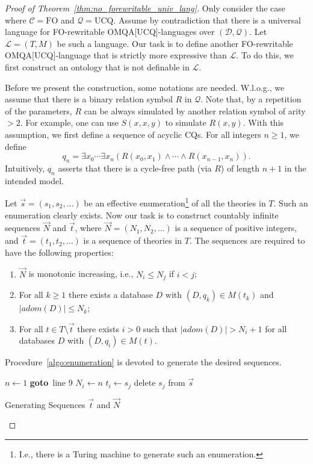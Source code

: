 \documentclass[letterpaper]{article} %
\theoremstyle{definition}
\theoremstyle{remark}
\theoremstyle{definition}
\begin{document}
\begin{proof}[Proof of Theorem~\ref{thm:no_forewritable_univ_lang}]
Only consider the case where $\mathcal{C}=\text{FO}$ and $\mathcal{Q}=\text{UCQ}$. Assume by contradiction that there is a universal language for FO-rewritable OMQA[UCQ]-languages over $(\mathscr{D},\mathscr{Q})$. Let $\mathcal{L}=(T,M)$ be such a language. Our task is to define another FO-rewritable OMQA[UCQ]-language that is strictly more expressive than $\mathcal{L}$. To do this, we first construct an ontology that is not definable in $\mathcal{L}$.

Before we present the construction, some notations are needed. W.l.o.g., we assume that there is a binary relation symbol $R$ in $\mathscr{Q}$. Note that, by a repetition of the parameters, $R$ can be always simulated by another relation symbol of arity $>2$. For example, one can use $S(x,x,y)$ to simulate $R(x,y)$. With this assumption, we first define a sequence of acyclic CQs. For all integers $n\ge 1$, we define
\begin{equation*}
q_n= \exists x_0\cdots\exists x_n(R(x_0,x_1)\wedge\cdots\wedge R(x_{n-1},x_n)).
\end{equation*}
Intuitively, $q_n$ asserts that there is a cycle-free path (via $R$) of length $n+1$ in the intended model.

Let $\vec{s}=(s_1,s_2,\dots)$ be an effective enumeration\footnote{I.e., there is a Turing machine to generate such an enumeration.} of all the theories in $T$. Such an enumeration clearly exists. Now our task is to construct countably infinite sequences $\vec{N}$ and $\vec{t}$, where $\vec{N}=(N_1,N_2,\dots)$ is a sequence of positive integers, and $\vec{t}=(t_1,t_2,\dots)$ is a sequence of theories in $T$. The sequences are required to have the following properties:
\begin{enumerate}
\item $\vec{N}$ is monotonic increasing, i.e., $N_i\le N_j$ if $i<j$;
\item For all $k\ge 1$ there exists a database $D$ with $(D,q_k)\in M(t_k)$ and $|{adom}(D)|\le N_k$;
\item For all $t\in T\setminus \vec{t}$ there exists $i>0$ such that $|adom(D)|>N_i+1$ for all databases $D$ with $(D,q_i)\in M(t)$. 
\end{enumerate}

Procedure~\ref{algo:enumeration} is devoted to generate the desired sequences. 
\begin{algorithm}
{
	$n\leftarrow 1$ \; 
	{
		{  
	        		{
	        			{
	        				{\bf goto}~line 9
	        			}
			}
		}
		$N_i\longleftarrow n$ \; 
		$t_i\longleftarrow s_j$ \;
		delete $s_j$ from $\vec{s}$ \;
	}  
	\caption{Generating Sequences $\vec{t}$ and $\vec{N}$}
	\label{algo:enumeration}
}
\end{algorithm}


\end{proof}
\end{document}

